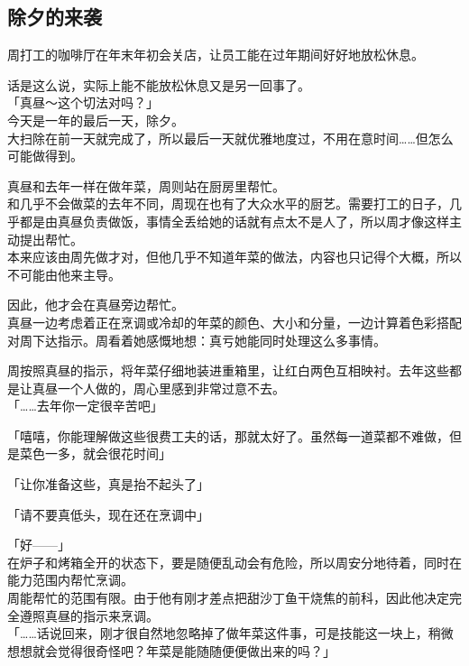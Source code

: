 \subsection{除夕的来袭}

周打工的咖啡厅在年末年初会关店，让员工能在过年期间好好地放松休息。

话是这么说，实际上能不能放松休息又是另一回事了。\\

「真昼～这个切法对吗？」\\

今天是一年的最后一天，除夕。\\

大扫除在前一天就完成了，所以最后一天就优雅地度过，不用在意时间……但怎么可能做得到。

真昼和去年一样在做年菜，周则站在厨房里帮忙。\\

和几乎不会做菜的去年不同，周现在也有了大众水平的厨艺。需要打工的日子，几乎都是由真昼负责做饭，事情全丢给她的话就有点太不是人了，所以周才像这样主动提出帮忙。\\

本来应该由周先做才对，但他几乎不知道年菜的做法，内容也只记得个大概，所以不可能由他来主导。

因此，他才会在真昼旁边帮忙。\\

真昼一边考虑着正在烹调或冷却的年菜的颜色、大小和分量，一边计算着色彩搭配对周下达指示。周看着她感慨地想：真亏她能同时处理这么多事情。

周按照真昼的指示，将年菜仔细地装进重箱里，让红白两色互相映衬。去年这些都是让真昼一个人做的，周心里感到非常过意不去。\\

「……去年你一定很辛苦吧」

「嘻嘻，你能理解做这些很费工夫的话，那就太好了。虽然每一道菜都不难做，但是菜色一多，就会很花时间」

「让你准备这些，真是抬不起头了」

「请不要真低头，现在还在烹调中」

「好——」\\

在炉子和烤箱全开的状态下，要是随便乱动会有危险，所以周安分地待着，同时在能力范围内帮忙烹调。\\

周能帮忙的范围有限。由于他有刚才差点把甜沙丁鱼干烧焦的前科，因此他决定完全遵照真昼的指示来烹调。\\

「……话说回来，刚才很自然地忽略掉了做年菜这件事，可是技能这一块上，稍微想想就会觉得很奇怪吧？年菜是能随随便便做出来的吗？」

